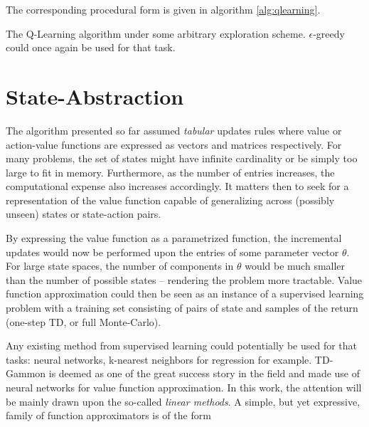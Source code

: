 \documentclass[12pt, oneside, extrafontsizes]{memoir}  %
\theoremstyle{plain}
\theoremstyle{definition}
\begin{document}
The corresponding procedural form is given in algorithm \ref{alg:qlearning}.

\begin{algorithm}
\DontPrintSemicolon
{}
\caption{The Q-Learning algorithm under some arbitrary exploration scheme.
$\epsilon$-greedy could once again be used for that task.}
\label{alg:qlearning}
\end{algorithm}

\section{State-Abstraction}
The algorithm presented so far assumed \textit{tabular} updates rules where value or
action-value functions are expressed as vectors and matrices respectively. For many
problems, the set of states might have infinite cardinality or be simply too large to fit in
memory. Furthermore, as the number of entries increases, the computational expense
 also increases accordingly. It matters then to seek for a representation of the
value function capable of generalizing across (possibly unseen) states or state-action
pairs.

By expressing the value function as a parametrized function, the incremental updates
would now be performed upon the entries of some parameter vector $\theta$. For
large state spaces, the number of components in $\theta$ would be much smaller than
the number of possible states -- rendering the problem more tractable. Value function
approximation could then be seen as an instance of a supervised learning problem
with a training set consisting of pairs of state and samples of the return (one-step TD,
or full Monte-Carlo).

Any existing method from supervised learning could potentially be used for that tasks:
neural networks, k-nearest neighbors for regression for example. TD-Gammon
\cite{Tesauro1995} is deemed as one of the great success story in the field and made 
use of neural networks for value function approximation. In this work, the attention
will be mainly drawn upon the so-called \textit{linear methods}. A simple, but yet
expressive, family of function approximators is of the form
\end{document}

